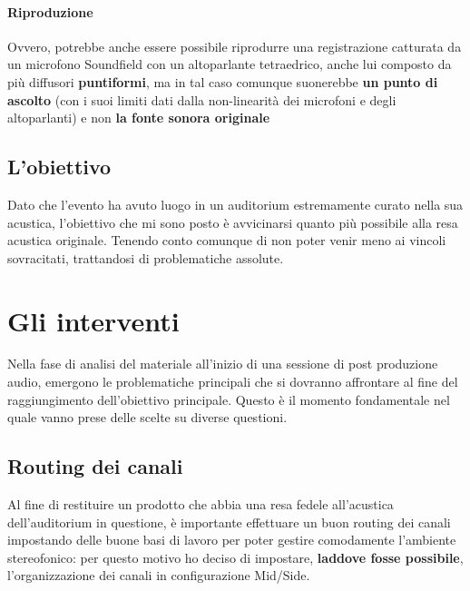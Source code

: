 	\paragraph{Riproduzione} Ovvero, potrebbe anche essere possibile riprodurre una registrazione catturata da un microfono Soundfield con un altoparlante tetraedrico, anche lui composto da più diffusori \textbf{puntiformi}, ma in tal caso comunque suonerebbe \textbf{un punto di ascolto} (con i suoi limiti dati dalla non-linearità dei microfoni e degli altoparlanti) e non \textbf{la fonte sonora originale}
	
	
	\subsection{L'obiettivo}
	Dato che l'evento ha avuto luogo in un auditorium estremamente curato nella sua acustica, l'obiettivo che mi sono posto è avvicinarsi quanto più possibile alla resa acustica originale. Tenendo conto comunque di non poter venir meno ai vincoli sovracitati, trattandosi di problematiche assolute.
	
\section{Gli interventi}
Nella fase di analisi del materiale all'inizio di una sessione di post produzione audio, emergono le problematiche principali che si dovranno affrontare al fine del raggiungimento dell'obiettivo principale. Questo è il momento fondamentale nel quale vanno prese delle scelte su diverse questioni.

	\subsection{Routing dei canali}
	Al fine di restituire un prodotto che abbia una resa fedele all'acustica dell'auditorium in questione, è importante effettuare un buon routing dei canali impostando delle buone basi di lavoro per poter gestire comodamente l'ambiente stereofonico: per questo motivo ho deciso di impostare, \textbf{laddove fosse possibile}, l'organizzazione dei canali in configurazione Mid/Side.
	

